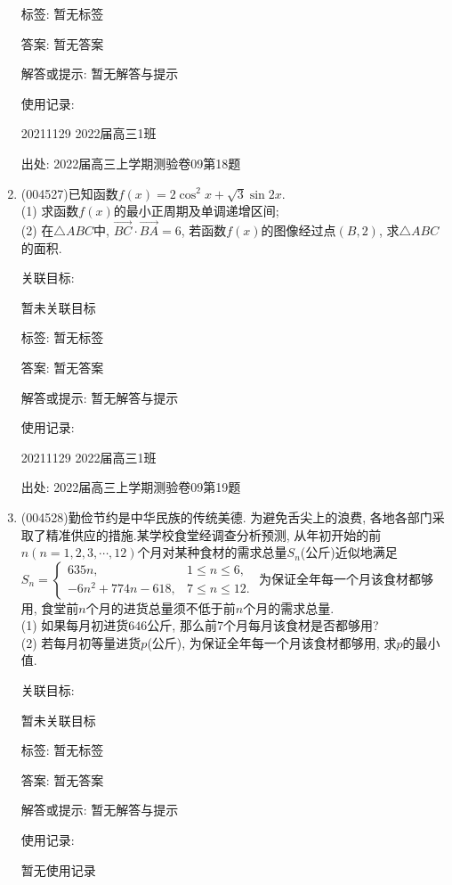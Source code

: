 \documentclass[10pt,a4paper]{article}
\begin{document}
\begin{enumerate}[1.]
标签: 暂无标签

答案: 暂无答案

解答或提示: 暂无解答与提示

使用记录:

20211129	2022届高三1班		


出处: 2022届高三上学期测验卷09第18题
\item { (004527)}已知函数$f(x)=2\cos^2x+\sqrt 3\sin 2x$.\\
(1) 求函数$f(x)$的最小正周期及单调递增区间;\\
(2) 在$\triangle ABC$中, $\overrightarrow{BC}\cdot \overrightarrow{BA}=6$, 若函数$f(x)$的图像经过点$(B,2)$, 求$\triangle ABC$的面积.


关联目标:

暂未关联目标



标签: 暂无标签

答案: 暂无答案

解答或提示: 暂无解答与提示

使用记录:

20211129	2022届高三1班		


出处: 2022届高三上学期测验卷09第19题
\item { (004528)}勤俭节约是中华民族的传统美德. 为避免舌尖上的浪费, 各地各部门采取了精准供应的措施.某学校食堂经调查分析预测, 从年初开始的前$n(n=1,2,3,\cdots ,12)$个月对某种食材的需求总量$S_n$(公斤)近似地满足$S_n=\begin{cases} 635n, & 1\le n\le 6,  \\ -6n^2+774n-618, & 7\le n\le 12 . \end{cases}$ 为保证全年每一个月该食材都够用, 食堂前$n$个月的进货总量须不低于前$n$个月的需求总量.\\
(1) 如果每月初进货$646$公斤, 那么前$7$个月每月该食材是否都够用?\\
(2) 若每月初等量进货$p$(公斤), 为保证全年每一个月该食材都够用, 求$p$的最小值.


关联目标:

暂未关联目标



标签: 暂无标签

答案: 暂无答案

解答或提示: 暂无解答与提示

使用记录:

暂无使用记录



\end{enumerate}
\end{document}
